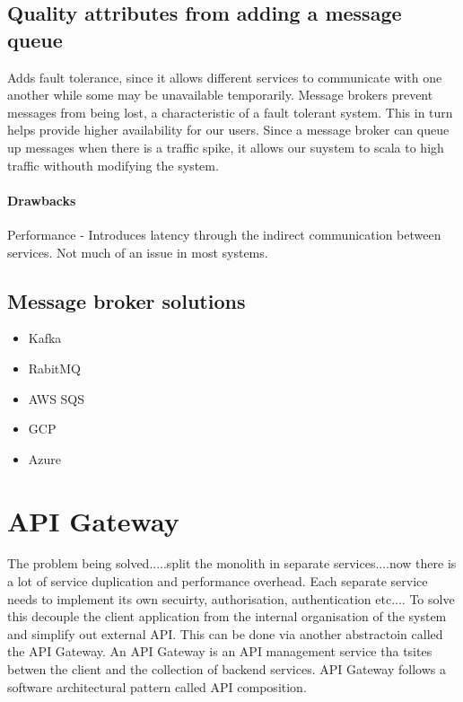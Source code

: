 \documentclass[a4paper, 11pt]{book}
\begin{document}
    \subsection{Quality attributes from adding a message queue}
    Adds fault tolerance, since it allows different services to communicate with one another while some may be unavailable temporarily.
    Message brokers prevent messages from being lost, a characteristic of a fault tolerant system.
    This in turn helps provide higher availability for our users.
    Since a message broker can queue up messages when there is a traffic spike, it allows our suystem to scala to high traffic withouth modifying the system.

    \paragraph{Drawbacks}
    Performance - Introduces latency through the indirect communication between services. Not much of an issue in most systems.

    \subsection{Message broker solutions}
    \begin{itemize}
        \item Kafka
        \item RabitMQ
        \item AWS SQS
        \item GCP
        \item Azure %
    \end{itemize}


    \section{API Gateway}
    The problem being solved.....split the monolith in separate services....now there is a lot of service duplication and performance overhead.
    Each separate service needs to implement its own secuirty, authorisation, authentication etc....
    To solve this decouple the client application from the internal organisation of the system and simplify out external API.
    This can be done via another abstractoin called the API Gateway.
    An API Gateway is an API management service tha tsites betwen the client and the collection of backend services.
    API Gateway follows a software architectural pattern called API composition.
\end{document}
